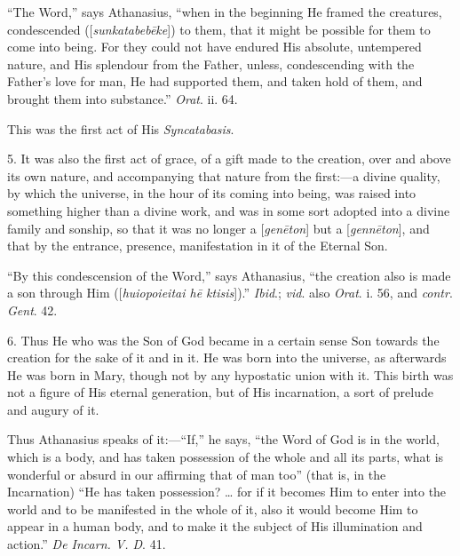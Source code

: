 ``The Word,'' says Athanasius, ``when in the beginning
He framed the creatures, condescended ([\emph{sunkatabeb\={e}ke}])
to them, that it might be possible for them to come into being. For
they could not have endured His absolute, untempered nature, and His
splendour from the Father, unless, condescending with the Father's
love for man, He had supported them, and taken hold of them, and
brought them into substance.'' \emph{Orat}. ii. 64.

This was the first act of His \emph{Syncatabasis}.

5. It was also the first act of grace, of a gift made to the
creation, over and above its own nature, and accompanying that nature
from the first:—a divine quality, by which the universe, in the hour
of its coming into being, was raised into something higher than a
divine work, and was in some sort adopted into a divine family and
sonship, so that it was no longer a [\emph{gen\={e}ton}] but a [\emph{genn\={e}ton}],
and that by the entrance, presence, manifestation in it of the Eternal
Son.

``By this condescension of the Word,'' says Athanasius,
``the creation also is made a son through Him ([\emph{huiopoieitai h\={e}
ktisis}]).'' \emph{Ibid}.; \emph{vid}. also \emph{Orat}. i. 56,
and \emph{contr}. \emph{Gent}. 42.

6. Thus He who was the Son of God became in a certain sense Son
towards the creation for the sake of it and in it. He was born into
the universe, as afterwards He was born in Mary, though not by any
hypostatic union with it. This birth was not a figure of His eternal
generation, but of His incarnation, a sort of prelude and augury of
it.

Thus Athanasius speaks of it:—``If,'' he says, ``the
Word of God is in the world, which is a body, and has taken possession
of the whole and all its parts, what is wonderful or absurd in our
affirming that of man too'' (that is, in the Incarnation) ``He
has taken possession? … for if it becomes Him to enter into the
world and to be manifested in the whole of it, also it would become
Him to appear in a human body, and to make it the subject of His
illumination and action.'' \emph{De Incarn. V. D}.
41.

